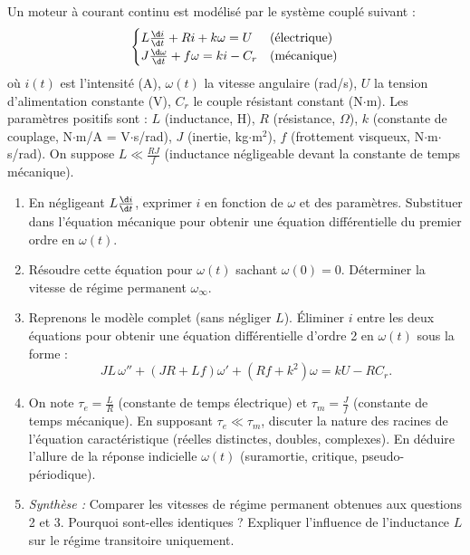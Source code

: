 \documentclass[11pt]{article}
\begin{document}
\begin{exercice}
Un moteur à courant continu est modélisé par le système couplé suivant :
\[\begin{cases}
L \frac{\d i}{\d t} + R i + k \omega = U & \text{(électrique)} \\
J \frac{\d \omega}{\d t} + f \omega = k i - C_r & \text{(mécanique)}
\end{cases}\]
où $i(t)$ est l'intensité (A), $\omega(t)$ la vitesse angulaire (rad/s), $U$ la tension d'alimentation constante (V), $C_r$ le couple résistant constant (N$\cdot$m). Les paramètres positifs sont : $L$ (inductance, H), $R$ (résistance, $\Omega$), $k$ (constante de couplage, N$\cdot$m/A = V$\cdot$s/rad), $J$ (inertie, kg$\cdot$m$^2$), $f$ (frottement visqueux, N$\cdot$m$\cdot$s/rad). On suppose $L \ll \frac{RJ}{f}$ (inductance négligeable devant la constante de temps mécanique).
\begin{enumerate}
    \item En négligeant $L \frac{\d i}{\d t}$, exprimer $i$ en fonction de $\omega$ et des paramètres. Substituer dans l'équation mécanique pour obtenir une équation différentielle du premier ordre en $\omega(t)$.
    \item Résoudre cette équation pour $\omega(t)$ sachant $\omega(0)=0$. Déterminer la vitesse de régime permanent $\omega_{\infty}$.
    \item Reprenons le modèle complet (sans négliger $L$). Éliminer $i$ entre les deux équations pour obtenir une équation différentielle d'ordre 2 en $\omega(t)$ sous la forme :
    \[J L \, \omega'' + (J R + L f) \omega' + (R f + k^2) \omega = k U - R C_r.\]
    \item On note $\tau_e = \frac{L}{R}$ (constante de temps électrique) et $\tau_m = \frac{J}{f}$ (constante de temps mécanique). En supposant $\tau_e \ll \tau_m$, discuter la nature des racines de l'équation caractéristique (réelles distinctes, doubles, complexes). En déduire l'allure de la réponse indicielle $\omega(t)$ (suramortie, critique, pseudo-périodique).
    \item \textit{Synthèse :} Comparer les vitesses de régime permanent obtenues aux questions 2 et 3. Pourquoi sont-elles identiques ? Expliquer l'influence de l'inductance $L$ sur le régime transitoire uniquement.
\end{enumerate}
\end{exercice}
\end{document}
